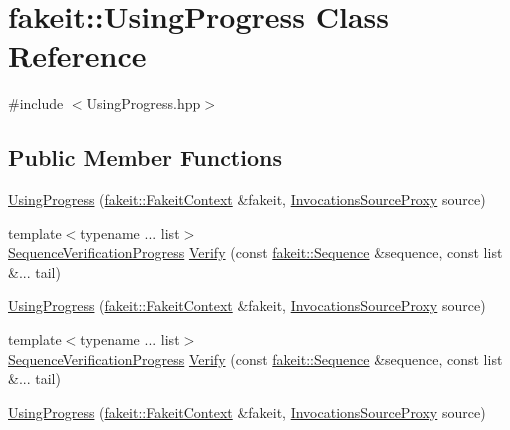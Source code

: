 \hypertarget{classfakeit_1_1UsingProgress}{}\section{fakeit\+::Using\+Progress Class Reference}
\label{classfakeit_1_1UsingProgress}


{\ttfamily \#include $<$Using\+Progress.\+hpp$>$}

\subsection*{Public Member Functions}
\begin{DoxyCompactItemize}
\item 
\mbox{\hyperlink{classfakeit_1_1UsingProgress_ac87db7ffa3ed53507cb2c98c2c0b4ee7}{Using\+Progress}} (\mbox{\hyperlink{structfakeit_1_1FakeitContext}{fakeit\+::\+Fakeit\+Context}} \&fakeit, \mbox{\hyperlink{structfakeit_1_1InvocationsSourceProxy}{Invocations\+Source\+Proxy}} source)
\item 
{\footnotesize template$<$typename ... list$>$ }\\\mbox{\hyperlink{classfakeit_1_1SequenceVerificationProgress}{Sequence\+Verification\+Progress}} \mbox{\hyperlink{classfakeit_1_1UsingProgress_a56c5d1ecdf4f405a4a85b348e1fad0f1}{Verify}} (const \mbox{\hyperlink{classfakeit_1_1Sequence}{fakeit\+::\+Sequence}} \&sequence, const list \&... tail)
\item 
\mbox{\hyperlink{classfakeit_1_1UsingProgress_ac87db7ffa3ed53507cb2c98c2c0b4ee7}{Using\+Progress}} (\mbox{\hyperlink{structfakeit_1_1FakeitContext}{fakeit\+::\+Fakeit\+Context}} \&fakeit, \mbox{\hyperlink{structfakeit_1_1InvocationsSourceProxy}{Invocations\+Source\+Proxy}} source)
\item 
{\footnotesize template$<$typename ... list$>$ }\\\mbox{\hyperlink{classfakeit_1_1SequenceVerificationProgress}{Sequence\+Verification\+Progress}} \mbox{\hyperlink{classfakeit_1_1UsingProgress_a56c5d1ecdf4f405a4a85b348e1fad0f1}{Verify}} (const \mbox{\hyperlink{classfakeit_1_1Sequence}{fakeit\+::\+Sequence}} \&sequence, const list \&... tail)
\item 
\mbox{\hyperlink{classfakeit_1_1UsingProgress_ac87db7ffa3ed53507cb2c98c2c0b4ee7}{Using\+Progress}} (\mbox{\hyperlink{structfakeit_1_1FakeitContext}{fakeit\+::\+Fakeit\+Context}} \&fakeit, \mbox{\hyperlink{structfakeit_1_1InvocationsSourceProxy}{Invocations\+Source\+Proxy}} source)
\item 

\end{DoxyCompactItemize}
